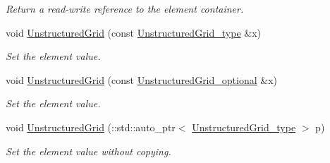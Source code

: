 \begin{DoxyCompactItemize}
\begin{DoxyCompactList}\small\item\em Return a read-\/write reference to the element container. \end{DoxyCompactList}\item 
void \hyperlink{classVTKFile__t_a2c2b1b2ff487c7e61bcd2875db8747be}{Unstructured\-Grid} (const \hyperlink{classVTKFile__t_a34ea02f6804e701657f11a8dc3851951}{Unstructured\-Grid\-\_\-type} \&x)
\begin{DoxyCompactList}\small\item\em Set the element value. \end{DoxyCompactList}\item 
void \hyperlink{classVTKFile__t_ae33d9781bddb747f9255570b1af2dfeb}{Unstructured\-Grid} (const \hyperlink{classVTKFile__t_ada5bb5a706e03ef1ab2ed1513ea83833}{Unstructured\-Grid\-\_\-optional} \&x)
\begin{DoxyCompactList}\small\item\em Set the element value. \end{DoxyCompactList}\item 
void \hyperlink{classVTKFile__t_af19a966f55acb5f03299af922bd9dd75}{Unstructured\-Grid} (\-::std\-::auto\-\_\-ptr$<$ \hyperlink{classVTKFile__t_a34ea02f6804e701657f11a8dc3851951}{Unstructured\-Grid\-\_\-type} $>$ p)
\begin{DoxyCompactList}\small\item\em Set the element value without copying. \end{DoxyCompactList}\end{DoxyCompactItemize}
